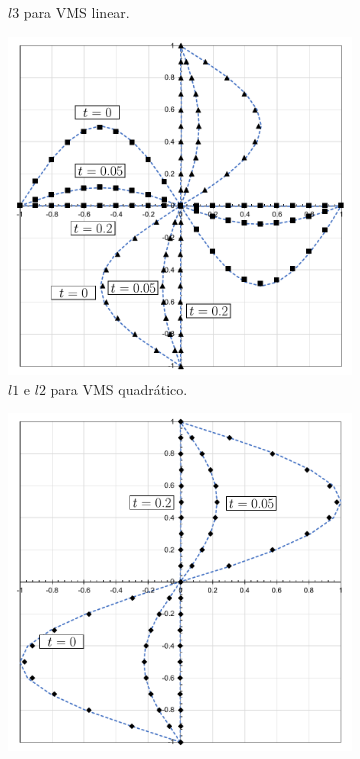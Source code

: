 \begin{figure}[h!]
\begin{subfigure}{0.42\textwidth}
        \caption{$l3$ para VMS linear.}
    \end{subfigure}
    \begin{subfigure}{0.42\textwidth}
        \includegraphics[width=\linewidth]{Figuras/taylor-green/VMS-Qua.pdf}
        \caption{$l1$ e $l2$ para VMS quadrático.}
    \end{subfigure}
    \begin{subfigure}{0.42\textwidth}
        \includegraphics[width=\linewidth]{Figuras/taylor-green/VMS-Qua-uz.pdf}

\end{subfigure}
\end{figure}
